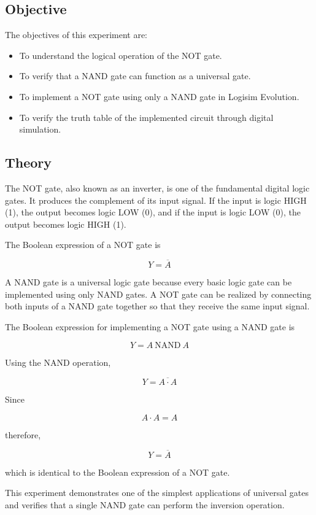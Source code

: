 \documentclass[12pt,a4paper]{article}
\begin{document}
\subsection{Objective}

The objectives of this experiment are:

\begin{itemize}
    \item To understand the logical operation of the NOT gate.
    \item To verify that a NAND gate can function as a universal gate.
    \item To implement a NOT gate using only a NAND gate in Logisim Evolution.
    \item To verify the truth table of the implemented circuit through digital simulation.
\end{itemize}

\subsection{Theory}

The NOT gate, also known as an inverter, is one of the fundamental digital logic gates. It produces the complement of its input signal. If the input is logic HIGH (1), the output becomes logic LOW (0), and if the input is logic LOW (0), the output becomes logic HIGH (1).

The Boolean expression of a NOT gate is

\[
Y=\overline{A}
\]

A NAND gate is a universal logic gate because every basic logic gate can be implemented using only NAND gates. A NOT gate can be realized by connecting both inputs of a NAND gate together so that they receive the same input signal.

The Boolean expression for implementing a NOT gate using a NAND gate is

\[
Y=A \ \text{NAND} \ A
\]

Using the NAND operation,

\[
Y=\overline{A \cdot A}
\]

Since

\[
A \cdot A=A
\]

therefore,

\[
Y=\overline{A}
\]

which is identical to the Boolean expression of a NOT gate.

This experiment demonstrates one of the simplest applications of universal gates and verifies that a single NAND gate can perform the inversion operation.
\end{document}

